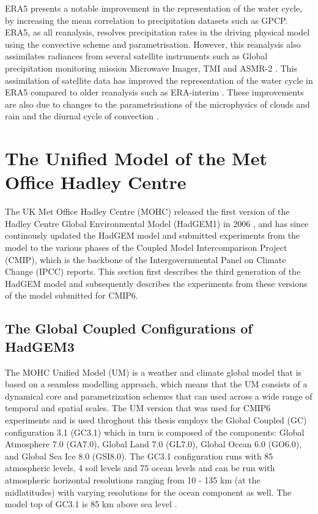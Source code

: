 ERA5 presents a notable improvement in the representation of the water cycle, by increasing the mean correlation to precipitation datasets such as GPCP. 
ERA5, as all reanalysis, resolves precipitation rates in the driving physical model using the convective scheme and parametrisation. However, this reanalysis also assimilates radiances from several satellite instruments such as Global precipitation monitoring mission Microwave Imager, TMI and ASMR-2 \cite{era5hersbach}. This assimilation of satellite data has improved the representation of the water cycle in ERA5 compared to older reanalysis such as ERA-interim \citep[e.g.][]{henin2018assessing}. These improvements are also due to changes to the parametrisations of the microphysics of clouds and rain \citep{forbes2014} and the diurnal cycle of convection \citep{bechtold2014}. 




\section{The Unified Model of the Met Office Hadley Centre}\label{sq:modeldata}

The UK Met Office Hadley Centre (MOHC) released the first version of the Hadley Centre Global Environmental Model (HadGEM1) in 2006 \citep{johns2006}, and has since continously updated the HadGEM model and submitted experiments from the model to the various phases of the Coupled Model Intercomparison Project (CMIP), which is the backbone of the Intergovernmental Panel on Climate Change (IPCC) reports. This section first describes the third generation of the HadGEM model and subsequently describes the experiments from these versions of the model submitted for CMIP6.  



\subsection{The Global Coupled Configurations of HadGEM3}

The MOHC Unified Model (UM) is a weather and climate global model that is based on a seamless modelling approach, which means that the UM consists of a dynamical core and parametrization schemes that can used across a wide range of temporal and spatial scales. 
The UM version that was used for CMIP6 experiments and is used throghout this thesis employs the Global Coupled (GC) configuration 3.1 (GC3.1) \citep{williams2018,walters2019} which in turn is composed of the components: Global Atmosphere 7.0 (GA7.0), Global Land 7.0
(GL7.0), Global Ocean 6.0 (GO6.0), and Global Sea Ice 8.0 (GSI8.0).
The GC3.1 configuration runs with 85 atmospheric levels, 4 soil levels and 75 ocean levels and can be run with atmospheric horizontal resolutions ranging from 10 - 135 km (at the midlatitudes) with varying resolutions for the ocean component as well. The model top of GC3.1 is 85 km above sea level \citep{walters2019}. 


